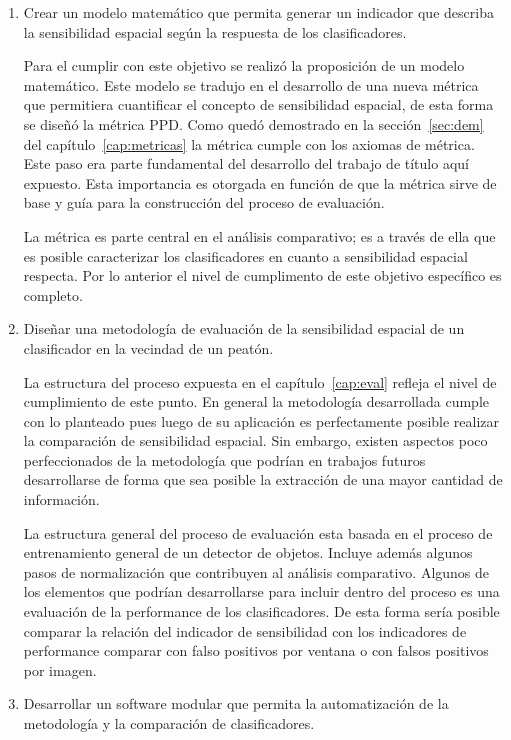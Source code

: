 \begin{enumerate}

\item Crear un modelo matemático que permita generar un indicador que describa la sensibilidad espacial según la respuesta de los clasificadores.

Para el cumplir con este objetivo se realizó la proposición de un modelo matemático. Este modelo se tradujo en el desarrollo de una nueva métrica que permitiera cuantificar el concepto de sensibilidad espacial, de esta forma se diseñó la métrica PPD. Como quedó demostrado en la sección~\ref{sec:dem} del capítulo~\ref{cap:metricas} la métrica cumple con los axiomas de métrica. Este paso era parte fundamental del desarrollo del trabajo de título aquí expuesto. Esta importancia es otorgada en función de que la métrica sirve de base y guía para la construcción del proceso de evaluación. 

La métrica es parte central en el análisis comparativo; es a través de ella que es posible caracterizar los clasificadores en cuanto a sensibilidad espacial respecta. Por lo anterior el nivel de cumplimento de este objetivo específico es completo.

\item Diseñar una metodología de evaluación de la sensibilidad espacial de un clasificador en la vecindad de un peatón.

La estructura del proceso expuesta en el capítulo~\ref{cap:eval} refleja el nivel de cumplimiento de este punto. En general la metodología desarrollada cumple con lo planteado pues luego de su aplicación es perfectamente posible realizar la comparación de sensibilidad espacial. Sin embargo, existen aspectos poco perfeccionados de la metodología que podrían en trabajos futuros desarrollarse de forma que sea posible la extracción de una mayor cantidad de información. 

La estructura general del proceso de evaluación esta basada en el proceso de entrenamiento general de un detector de objetos. Incluye además algunos pasos de normalización que contribuyen al análisis comparativo. Algunos de los elementos que podrían desarrollarse para incluir dentro del proceso es una evaluación de la performance de los clasificadores. De esta forma sería posible comparar la relación del indicador de sensibilidad con los indicadores de performance \ie comparar con falso positivos por ventana o con falsos positivos por imagen.


\item Desarrollar un software modular que permita la automatización de la metodología y la comparación de clasificadores.


\end{enumerate}
